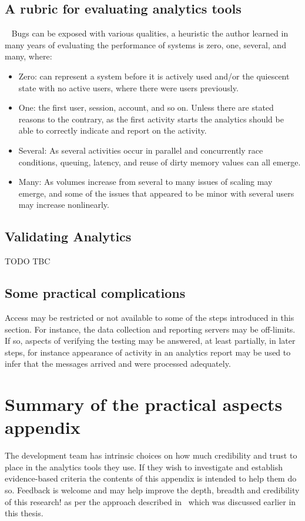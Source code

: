 \subsection{A rubric for evaluating analytics tools}~\label{rubric-for-evaluating-analytics-tools}
Bugs can be exposed with various qualities, a heuristic the author learned in many years of evaluating the performance of systems is zero, one, several, and many, where:
\begin{itemize}
    \item Zero: can represent a system before it is actively used and/or the quiescent state with no active users, where there were users previously.
    \item One: the first user, session, account, and so on. Unless there are stated reasons to the contrary, as the first activity starts the analytics should be able to correctly indicate and report on the activity.
    \item Several: As several activities occur in parallel and concurrently race conditions, queuing, latency, and reuse of dirty memory values can all emerge.
    \item Many: As volumes increase from several to many issues of scaling may emerge, and some of the issues that appeared to be minor with several users may increase nonlinearly. 
\end{itemize}

\subsection{Validating Analytics}

TODO TBC

\subsection{Some practical complications} 
Access may be restricted or not available to some of the steps introduced in this section. For instance, the data collection and reporting servers may be off-limits. If so, aspects of verifying the testing may be answered, at least partially, in later steps, for instance appearance of activity in an analytics report may be used to infer that the messages arrived and were processed adequately.





\section{Summary of the practical aspects appendix}
The development team has intrinsic choices on how much credibility and trust to place in the analytics tools they use. If they wish to investigate and establish evidence-based criteria the contents of this appendix is intended to help them do so. Feedback is welcome and may help improve the depth, breadth and credibility of this research! as per the approach described in~\cite{scaffidi2007developing} which was discussed earlier in this thesis.